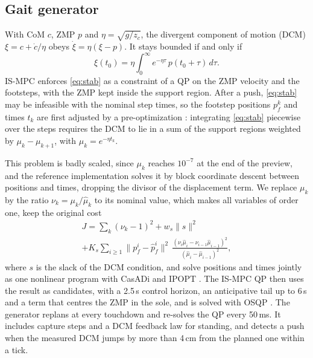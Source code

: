 \documentclass[conference]{IEEEtran}
\begin{document}
\subsection{Gait generator}
With CoM $c$, ZMP $p$ and $\eta=\sqrt{g/z_c}$, the divergent component of motion (DCM) $\xi=c+\dot c/\eta$ obeys $\dot\xi=\eta(\xi-p)$.
It stays bounded if and only if \cite{lanari2014boundedness}
\begin{equation}
\xi(t_0)=\eta\int_{0}^{\infty}e^{-\eta\tau}\,p(t_0+\tau)\,d\tau .
\label{eq:stab}
\end{equation}
IS-MPC \cite{scianca2020ismpc} enforces \eqref{eq:stab} as a constraint of a QP on the ZMP velocity and the footsteps, with the ZMP kept inside the support region.
After a push, \eqref{eq:stab} may be infeasible with the nominal step times, so the footstep positions $p_f^k$ and times $t_k$ are first adjusted by a pre-optimization \cite{dallard2025adios}: integrating \eqref{eq:stab} piecewise over the steps requires the DCM to lie in a sum of the support regions weighted by $\mu_k-\mu_{k+1}$, with $\mu_k=e^{-\eta t_k}$.

This problem is badly scaled, since $\mu_k$ reaches $10^{-7}$ at the end of the preview, and the reference implementation \cite{ismpcwalking} solves it by block coordinate descent between positions and times, dropping the divisor of the displacement term.
We replace $\mu_k$ by the ratio $\nu_k=\mu_k/\hat\mu_k$ to its nominal value, which makes all variables of order one, keep the original cost
\begin{multline}
J=\sum_k(\nu_k-1)^2+w_s\|s\|^2\\
+K_s\sum_{i\ge1}\big\|p_f^i-\hat p_f^i\big\|^2\,
\frac{(\nu_i\hat\mu_i-\nu_{i-1}\hat\mu_{i-1})^2}{(\hat\mu_i-\hat\mu_{i-1})^2},
\label{eq:cost}
\end{multline}
where $s$ is the slack of the DCM condition, and solve positions and times jointly as one nonlinear program with CasADi \cite{andersson2019casadi} and IPOPT \cite{wachter2006ipopt}.
The IS-MPC QP then uses the result as candidates, with a 2.5\,s control horizon, an anticipative tail up to 6\,s and a term that centres the ZMP in the sole, and is solved with OSQP \cite{stellato2020osqp}.
The generator replans at every touchdown and re-solves the QP every 50\,ms.
It includes capture steps and a DCM feedback law for standing, and detects a push when the measured DCM jumps by more than 4\,cm from the planned one within a tick.
\end{document}
